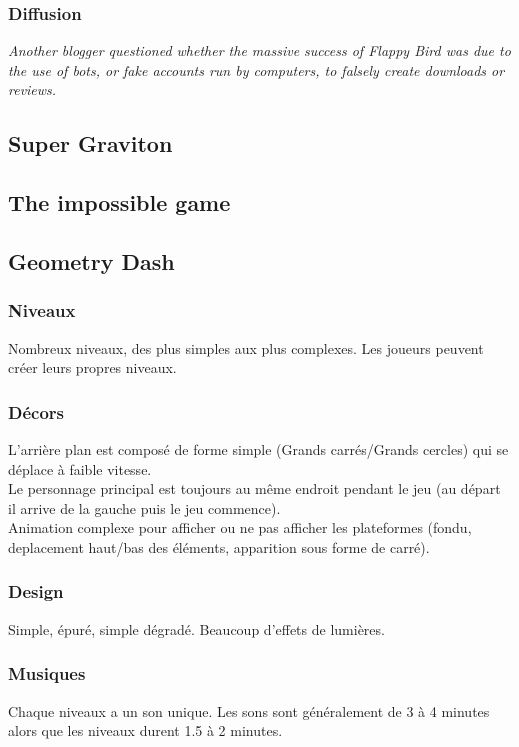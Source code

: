 \documentclass{article}
\begin{document}
\subsubsection{Diffusion}
\textit{Another blogger questioned whether the massive success of Flappy Bird was due to the use of bots, or fake accounts run by computers, to falsely create downloads or reviews.}

\subsection{Super Graviton}
\subsection{The impossible game}
\subsection{Geometry Dash}

\subsubsection{Niveaux}
Nombreux niveaux, des plus simples aux plus complexes. Les joueurs peuvent créer leurs propres niveaux. 

\subsubsection{Décors}
L'arrière plan est composé de forme simple (Grands carrés/Grands cercles) qui se déplace à faible vitesse.\\
Le personnage principal est toujours au même endroit pendant le jeu (au départ il arrive de la gauche puis le jeu commence).\\
Animation complexe pour afficher ou ne pas afficher les plateformes (fondu, deplacement haut/bas des éléments, apparition sous forme de carré).

\subsubsection{Design}
Simple, épuré, simple dégradé. Beaucoup d'effets de lumières.

\subsubsection{Musiques}
Chaque niveaux a un son unique. Les sons sont généralement de 3 à 4 minutes alors que les niveaux durent 1.5 à 2 minutes.
\end{document}
